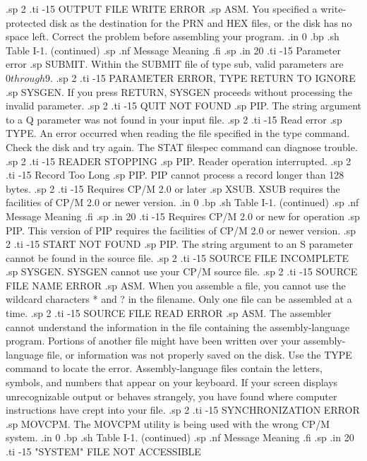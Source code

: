 .sp 2
.ti -15
OUTPUT FILE WRITE ERROR
.sp
ASM.  You specified a write-protected disk as the destination for 
the PRN and HEX files, or the disk has no space left.  Correct 
the problem before assembling your program.
.in 0
.bp
.sh
                     Table I-1.  (continued)
.sp
.nf
     Message        Meaning
.fi
.sp
.in 20
.ti -15
Parameter error
.sp
SUBMIT.  Within the SUBMIT file of type sub, valid parameters are 
$0 through $9.
.sp 2
.ti -15
PARAMETER ERROR, TYPE RETURN TO IGNORE
.sp
SYSGEN.  If you press RETURN, SYSGEN proceeds without processing 
the invalid parameter.
.sp 2
.ti -15
QUIT NOT FOUND
.sp
PIP.  The string argument to a Q parameter was not found in your 
input file.
.sp 2
.ti -15
Read error
.sp
TYPE.  An error occurred when reading the file specified in the 
type command.  Check the disk and try again.  The STAT filespec 
command can diagnose trouble.
.sp 2
.ti -15
READER STOPPING
.sp
PIP.  Reader operation interrupted.
.sp 2
.ti -15
Record Too Long
.sp
PIP.  PIP cannot process a record longer than 128 bytes.
.sp 2
.ti -15
Requires CP/M 2.0 or later
.sp
XSUB.  XSUB requires the facilities of CP/M 2.0 or newer version.
.in 0
.bp
.sh
                     Table I-1.  (continued)
.sp
.nf
     Message        Meaning
.fi
.sp
.in 20
.ti -15
Requires CP/M 2.0 or new for operation
.sp
PIP.  This version of PIP requires the facilities of CP/M 2.0 or 
newer version.
.sp 2
.ti -15
START NOT FOUND
.sp
PIP.  The string argument to an S parameter cannot be found in 
the source file.
.sp 2
.ti -15
SOURCE FILE INCOMPLETE
.sp
SYSGEN.  SYSGEN cannot use your CP/M source file.
.sp 2
.ti -15
SOURCE FILE NAME ERROR
.sp
ASM.  When you assemble a file, you cannot use the wildcard 
characters * and ? in the filename. Only one file can be 
assembled at a time.
.sp 2
.ti -15
SOURCE FILE READ ERROR
.sp
ASM.  The assembler cannot understand the information in the file 
containing the assembly-language program.  Portions of another 
file might have been written over your assembly-language file, or 
information was not properly saved on the disk.  Use the TYPE 
command to locate the error.  Assembly-language files contain the 
letters, symbols, and numbers that appear on your keyboard.  If 
your screen displays unrecognizable output or behaves strangely, 
you have found where computer instructions have crept into your 
file.
.sp 2
.ti -15
SYNCHRONIZATION ERROR
.sp
MOVCPM.  The MOVCPM utility is being used with the wrong CP/M 
system.
.in 0
.bp
.sh
                     Table I-1.  (continued)
.sp
.nf
     Message        Meaning
.fi
.sp
.in 20
.ti -15
"SYSTEM" FILE NOT ACCESSIBLE
